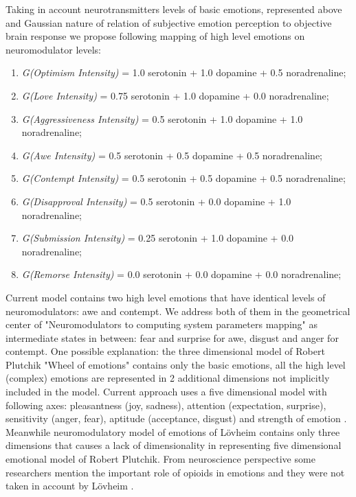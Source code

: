 Taking in account neurotransmitters levels of basic emotions, represented above  and Gaussian nature of relation of subjective emotion perception to objective brain response \cite{senticcomputing, neuralcorrelatesofhate, emotionsbraintorobot} we propose following mapping of high level emotions on neuromodulator levels:

\begin{enumerate}
 \item  \emph{G(Optimism Intensity)} = 1.0 serotonin  + 1.0 dopamine + 0.5 noradrenaline;
 \item  \emph{G(Love Intensity)} = 0.75 serotonin + 1.0 dopamine + 0.0 noradrenaline;
 \item  \emph{G(Aggressiveness Intensity)} = 0.5 serotonin + 1.0 dopamine + 1.0 noradrenaline;
 \item  \emph{G(Awe Intensity)} = 0.5 serotonin + 0.5 dopamine + 0.5 noradrenaline;
 \item  \emph{G(Contempt Intensity)} = 0.5 serotonin + 0.5 dopamine + 0.5 noradrenaline;
 \item  \emph{G(Disapproval Intensity)} = 0.5 serotonin + 0.0 dopamine + 1.0 noradrenaline;
 \item  \emph{G(Submission Intensity)} = 0.25 serotonin + 1.0 dopamine + 0.0 noradrenaline;
 \item  \emph{G(Remorse Intensity)} = 0.0 serotonin + 0.0 dopamine + 0.0 noradrenaline;
\end{enumerate}

Current model contains two high level emotions that have identical levels of neuromodulators: awe and contempt. We address both of them in the geometrical center of "Neuromodulators to computing system parameters mapping" as intermediate states in between: fear and surprise for awe, disgust and anger for contempt. One possible explanation: the three dimensional model of Robert Plutchik "Wheel of emotions" contains only the basic emotions, all the high level (complex) emotions are represented in 2 additional dimensions not implicitly included in the model. Current approach uses a five dimensional model with following axes: pleasantness (joy, sadness), attention (expectation, surprise), sensitivity (anger, fear), aptitude (acceptance, disgust) and strength of emotion \cite{senticcomputing, hourglass}. Meanwhile neuromodulatory model of emotions of L\"{o}vheim contains only three dimensions that causes a lack of dimensionality in representing five dimensional emotional model of Robert Plutchik. From neuroscience perspective some researchers mention the important role of opioids in emotions and they were not taken in account by L\"{o}vheim \cite{emotionsbraintorobot, neuromodulatory}.

